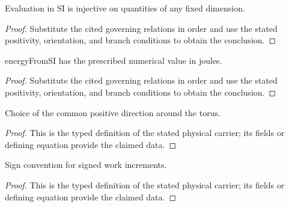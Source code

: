\begin{lemma}
  \label{lem:physics:IPhO_2026_3_A_3:aux012}
  Evaluation in SI is injective on quantities of any fixed dimension.
\end{lemma}
\begin{proof}
  Substitute the cited governing relations in order and use the stated positivity, orientation, and branch conditions to obtain the conclusion.
\end{proof}

\begin{lemma}
  \label{lem:physics:IPhO_2026_3_A_3:aux013}
  energyFromSI has the prescribed numerical value in joules.
\end{lemma}
\begin{proof}
  Substitute the cited governing relations in order and use the stated positivity, orientation, and branch conditions to obtain the conclusion.
\end{proof}

\begin{definition}
  \label{def:physics:IPhO_2026_3_A_3:aux014}
  Choice of the common positive direction around the torus.
\end{definition}
\begin{proof}
  This is the typed definition of the stated physical carrier; its fields or defining equation provide the claimed data.
\end{proof}

\begin{definition}
  \label{def:physics:IPhO_2026_3_A_3:aux015}
  Sign convention for signed work increments.
\end{definition}
\begin{proof}
  This is the typed definition of the stated physical carrier; its fields or defining equation provide the claimed data.
\end{proof}

